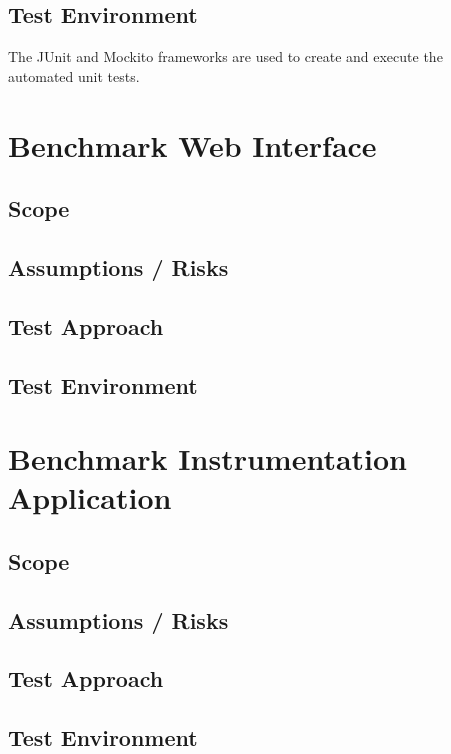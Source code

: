 \documentclass[11pt,a4paper]{article}
\begin{document}
\subsection{Test Environment}
The JUnit and Mockito frameworks are used to create and execute the automated
unit tests.

\section{Benchmark Web Interface}
\subsection{Scope}
\subsection{Assumptions / Risks}
\subsection{Test Approach}
\subsection{Test Environment}

\section{Benchmark Instrumentation Application}
\subsection{Scope}
\subsection{Assumptions / Risks}
\subsection{Test Approach}
\subsection{Test Environment}
\end{document}
